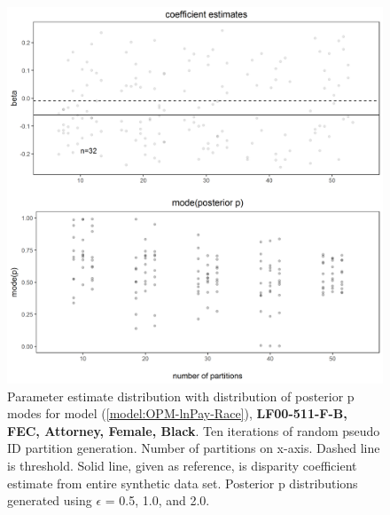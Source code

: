 \documentclass[10pt, letterpaper]{article}
\begin{document}
\begin{spacing}{1.0}
\begin{figure}[h!]
    \centering
    \includegraphics[width=5in]{images/RacePayDifferentialBetaWithPosteriorDistribution-LF00-905-F-B.png}
    \caption{Parameter estimate distribution with distribution of posterior p modes for model (\ref{model:OPM-lnPay-Race}), \textbf{LF00-511-F-B, FEC, Attorney, Female, Black}.  Ten iterations of random pseudo ID partition generation.  Number of partitions on x-axis.  Dashed line is threshold.  Solid line, given as reference, is disparity coefficient estimate from entire synthetic data set.  Posterior p distributions generated using $\epsilon$ = 0.5, 1.0, and 2.0.}
    \label{figure:RacePayDifferentialBetaWithPosteriorDistribution-LF00-905-F-B}
\end{figure}

\clearpage


\end{spacing}
\end{document}
